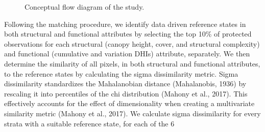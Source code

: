 \documentclass[
]{agujournal2019}
\begin{document}
\label{cell-fig-flow}
\begin{figure}[H]


\caption{\label{fig-flow}Conceptual flow diagram of the study.}

\end{figure}%

Following the matching procedure, we identify data driven reference
states in both structural and functional attributes by selecting the top
10\% of protected observations for each structural (canopy height,
cover, and structural complexity) and functional (cumulative and
variation DHIs) attribute, separately. We then determine the similarity
of all pixels, in both structural and functional attributes, to the
reference states by calculating the sigma dissimilarity metric. Sigma
dissimilarity standardizes the Mahalanobian distance (Mahalanobis, 1936)
by rescaling it into percentiles of the chi distribution (Mahony et al.,
2017). This effectively accounts for the effect of dimensionality when
creating a multivariate similarity metric (Mahony et al., 2017). We
calculate sigma dissimilarity for every strata with a suitable reference
state, for each of the 6
\end{document}
